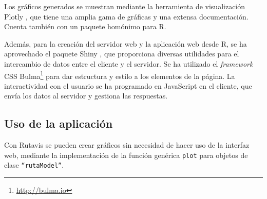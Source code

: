 Los gráficos generados se muestran mediante la herramienta de visualización Plotly \autocite{plotly}, que tiene una amplia gama de gráficas y una extensa documentación. Cuenta también con un paquete homónimo para R.

Además, para la creación del servidor web y la aplicación web desde R, se ha aprovechado el paquete Shiny \autocite{shiny}, que proporciona diversas utilidades para el intercambio de datos entre el cliente y el servidor. Se ha utilizado el \emph{framework} CSS Bulma\footnote{\url{http://bulma.io}} para dar estructura y estilo a los elementos de la página. La interactividad con el usuario se ha programado en JavaScript en el cliente, que envía los datos al servidor y gestiona las respuestas.

\subsection{Uso de la aplicación}\label{uso-de-la-aplicaciuxf3n}

Con Rutavis se pueden crear gráficos sin necesidad de hacer uso de la interfaz web, mediante la implementación de la función genérica \texttt{plot} para objetos de clase \texttt{``rutaModel''}.

